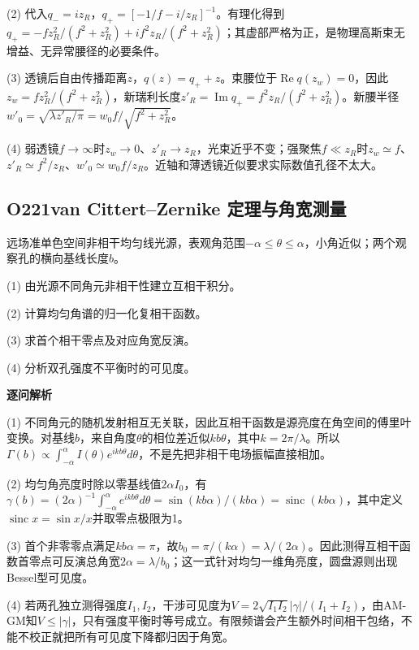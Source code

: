(2) 代入$q_-=iz_R$，$q_+=[-1/f-i/z_R]^{-1}$。有理化得到$q_+=-fz_R^2/(f^2+z_R^2)+i f^2z_R/(f^2+z_R^2)$；其虚部严格为正，是物理高斯束无增益、无异常腰径的必要条件。

(3) 透镜后自由传播距离$z$，$q(z)=q_++z$。束腰位于$\operatorname{Re}q(z_w)=0$，因此$z_w=fz_R^2/(f^2+z_R^2)$，新瑞利长度$z'_R=\operatorname{Im}q_+=f^2z_R/(f^2+z_R^2)$。新腰半径$w'_0=\sqrt{\lambda z'_R/\pi}=w_0f/\sqrt{f^2+z_R^2}$。

(4) 弱透镜$f\to\infty$时$z_w\to0$、$z'_R\to z_R$，光束近乎不变；强聚焦$f\ll z_R$时$z_w\simeq f$、$z'_R\simeq f^2/z_R$、$w'_0\simeq w_0f/z_R$。近轴和薄透镜近似要求实际数值孔径不太大。

\par\medskip

\subsection*{O221\quad van Cittert–Zernike 定理与角宽测量}

远场准单色空间非相干均匀线光源，表观角范围$-\alpha\le\theta\le\alpha$，小角近似；两个观察孔的横向基线长度$b$。

(1) 由光源不同角元非相干性建立互相干积分。

(2) 计算均匀角谱的归一化复相干函数。

(3) 求首个相干零点及对应角宽反演。

(4) 分析双孔强度不平衡时的可见度。

\par\textbf{逐问解析}

(1) 不同角元的随机发射相互无关联，因此互相干函数是源亮度在角空间的傅里叶变换。对基线$b$，来自角度$\theta$的相位差近似$kb\theta$，其中$k=2\pi/\lambda$。所以$\Gamma(b)\propto\int_{-\alpha}^{\alpha}I(\theta)e^{ikb\theta}d\theta$，不是先把非相干电场振幅直接相加。

(2) 均匀角亮度时除以零基线值$2\alpha I_0$，有$\gamma(b)=(2\alpha)^{-1}\int_{-\alpha}^{\alpha}e^{ikb\theta}d\theta=\sin(kb\alpha)/(kb\alpha)=\operatorname{sinc}(kb\alpha)$，其中定义$\operatorname{sinc}x=\sin x/x$并取零点极限为1。

(3) 首个非零零点满足$kb\alpha=\pi$，故$b_0=\pi/(k\alpha)=\lambda/(2\alpha)$。因此测得互相干函数首零点可反演总角宽$2\alpha=\lambda/b_0$；这一式针对均匀一维角亮度，圆盘源则出现Bessel型可见度。

(4) 若两孔独立测得强度$I_1,I_2$，干涉可见度为$V=2\sqrt{I_1I_2}|\gamma|/(I_1+I_2)$，由AM-GM知$V\le|\gamma|$，只有强度平衡时等号成立。有限频谱会产生额外时间相干包络，不能不校正就把所有可见度下降都归因于角宽。

